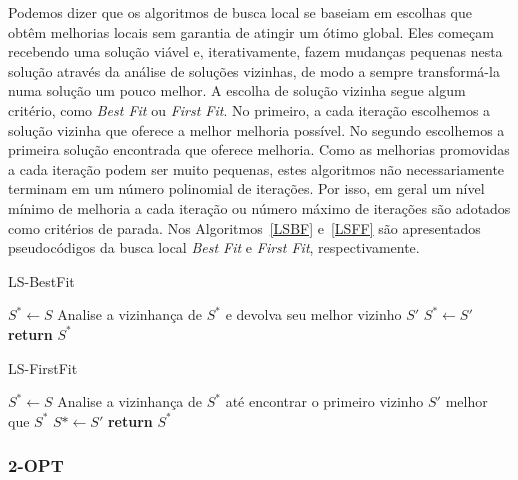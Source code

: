 \documentclass[12pt, a4paper]{article}
\begin{document}
Podemos dizer que os algoritmos de busca local se baseiam em escolhas que obtêm melhorias locais sem garantia de atingir um ótimo global. Eles começam recebendo uma solução viável e, iterativamente, fazem mudanças pequenas nesta solução através da análise de soluções vizinhas, de modo a sempre transformá-la numa solução um pouco melhor. A escolha de solução vizinha segue algum critério, como \textit{Best Fit} ou \textit{First Fit}. No primeiro, a cada iteração escolhemos a solução vizinha que oferece a melhor melhoria possível. No segundo escolhemos a primeira solução encontrada que oferece melhoria. Como as melhorias promovidas a cada iteração podem ser muito pequenas, estes algoritmos não necessariamente terminam em um número polinomial de iterações. Por isso, em geral um nível mínimo de melhoria a cada iteração ou número máximo de iterações são adotados como critérios de parada. Nos Algoritmos~\ref{LSBF} e~\ref{LSFF} são apresentados pseudocódigos da busca local \textit{Best Fit} e \textit{First Fit}, respectivamente.\par
%
\begin{algorithm}[htb!]
  \caption{LS-BestFit}\label{LSBF}
  \begin{algorithmic}[1]
      \State $S^* \gets S$
        \State Analise a vizinhança de $S^*$ e devolva seu melhor vizinho $S'$
	       \State $S^* \gets S'$
	  \EndIf
      \EndWhile
      \State \textbf{return} $S^*$
  \end{algorithmic}
\end{algorithm}

\begin{algorithm}[htb!]
  \caption{LS-FirstFit}\label{LSFF}
  \begin{algorithmic}[1]
      \State $S^* \gets S$
        \State Analise a vizinhança de $S^*$ até encontrar o primeiro vizinho $S'$ melhor que $S^*$
        \State $S*\gets S'$
      \EndWhile
      \State \textbf{return} $S^*$
  \end{algorithmic}
\end{algorithm}


\subsubsection{2-OPT}
\end{document}
